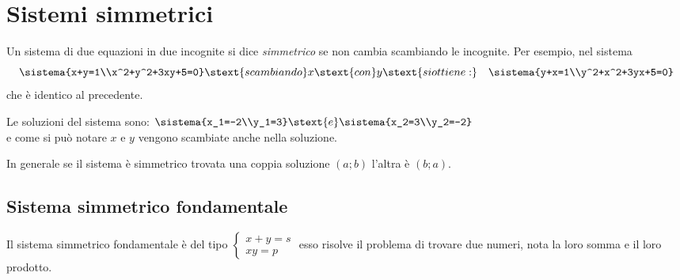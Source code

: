 % 
% 

\section{Sistemi simmetrici}
\label{sec:eq2gr_sistemi_simmetrici}

Un sistema di due equazioni in due incognite si dice \emph{simmetrico} se non 
cambia scambiando le incognite.
Per esempio, nel sistema 
\[\sistema{x+y=1\\x^2+y^2+3xy+5=0}
\stext{ scambiando } x \stext{ con } y \stext{ si ottiene: } \quad 
\sistema{y+x=1\\y^2+x^2+3yx+5=0}\] 
che è identico al precedente.

Le soluzioni del sistema sono:  
\(\sistema{x_1=-2\\y_1=3} \stext{ e } \sistema{x_2=3\\y_2=-2}\) \\
e come si può notare \(x\) e \(y\) vengono scambiate anche nella soluzione.

In generale se il sistema è simmetrico trovata una coppia soluzione \((a;b)\) 
l'altra è \((b;a)\).

\subsection{Sistema simmetrico fondamentale}
Il sistema simmetrico fondamentale è del tipo 
\(\left\{\begin{array}{l}{x+y=s}\\{xy=p}\end{array}\right.\) esso risolve il 
problema di trovare due numeri, nota la loro somma e il loro prodotto.

